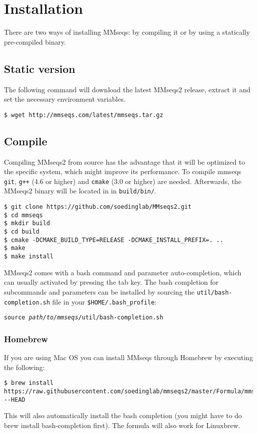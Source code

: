 \documentclass[11pt,a4paper]{scrreprt}
\begin{document}
\clearpage

\section{Installation}

There are two ways of installing MMseqs: by compiling it or by using a statically pre-compiled binary. 
\subsection{Static version}
The following command will download the latest MMseqs2 release, extract it and set the necessary environment variables.

\begin{verbatim}
$ wget http://mmseqs.com/latest/mmseqs.tar.gz
\end{verbatim}
\subsection{Compile}
Compiling MMseqs2 from source has the advantage that it will be optimized to the specific system, which might improve its performance. To compile mmseqs \texttt{git}, \texttt{g++} (4.6 or higher) and \texttt{cmake} (3.0 or higher) are needed. Afterwards, the MMseqs2 binary will be located in in \texttt{build/bin/}.

\begin{verbatim}
$ git clone https://github.com/soedinglab/MMseqs2.git
$ cd mmseqs
$ mkdir build
$ cd build
$ cmake -DCMAKE_BUILD_TYPE=RELEASE -DCMAKE_INSTALL_PREFIX=. ..
$ make 
$ make install 
\end{verbatim}

MMseqs2 comes with a bash command and parameter auto-completion, which can usually activated by pressing the tab key. The bash completion for subcommands and parameters can be installed by sourcing the \texttt{util/bash-completion.sh} file in your \texttt{\$HOME/.bash\_profile}:
\begin{flushleft}
\texttt{source \textit{path/to/mmseqs}/util/bash-completion.sh}
\end{flushleft}

\subsubsection{Homebrew}
If you are using Mac OS you can install MMseqs through Homebrew by executing the following:
\begin{Verbatim}[fontsize=\footnotesize]
$ brew install https://raw.githubusercontent.com/soedinglab/mmseqs2/master/Formula/mmseqs.rb --HEAD
\end{Verbatim}
This will also automatically install the bash completion (you might have to do brew install bash-completion first). The formula will also work for Linuxbrew.
\end{document}
